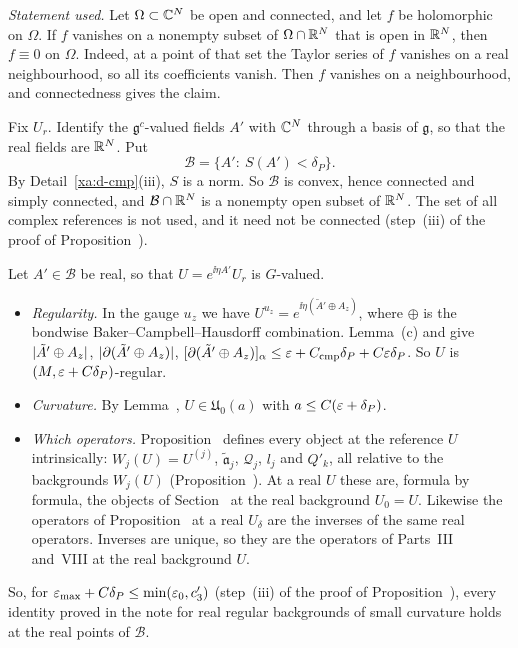 \begin{detail}\label{xa:d-identity}
\emph{Statement used.} Let $\Omega\subset\mathbb C^N$ be open and connected, and let $f$ be holomorphic on $\Omega$. If $f$ vanishes on a nonempty subset of $\Omega\cap\mathbb R^N$ that is open in $\mathbb R^N$, then $f\equiv0$ on $\Omega$. Indeed, at a point of that set the Taylor series of $f$ vanishes on a real neighbourhood, so all its coefficients vanish. Then $f$ vanishes on a neighbourhood, and connectedness gives the claim.

\begin{step}
Fix $U_r$. Identify the $\mathfrak g^c$-valued fields $A'$ with $\mathbb C^N$ through a basis of $\mathfrak g$, so that the real fields are $\mathbb R^N$. Put
\[
\mathcal B=\{A':\ S(A')<\delta_P\}.
\]
By Detail~\ref{xa:d-cmp}(iii), $S$ is a norm. So $\mathcal B$ is convex, hence connected and simply connected, and $\mathcal B\cap\mathbb R^N$ is a nonempty open subset of $\mathbb R^N$. The set of all complex references is not used, and it need not be connected (step~(iii) of the proof of Proposition~).
\end{step}

\begin{step}
Let $A'\in\mathcal B$ be real, so that $U=e^{\ii\eta A'}U_r$ is $G$-valued.
\begin{itemize}
\item \emph{Regularity.} In the gauge $u_z$ we have $U^{u_z}=e^{\ii\eta(\tilde A'\oplus A_z)}$, where $\oplus$ is the bondwise Baker--Campbell--Hausdorff combination. Lemma~(c) and  give $\lvert\tilde A'\oplus A_z\rvert$, $\lvert\partial(\tilde A'\oplus A_z)\rvert$, $[\partial(\tilde A'\oplus A_z)]_\alpha\le\varepsilon+C_{\rm cmp}\delta_P+C\varepsilon\delta_P$. So $U$ is $(M,\varepsilon+C\delta_P)$-regular.
\item \emph{Curvature.} By Lemma~, $U\in\mathfrak U_0(a)$ with $a\le C(\varepsilon+\delta_P)$.
\item \emph{Which operators.} Proposition~ defines every object at the reference $U$ intrinsically: $W_j(U)=U^{(j)}$, $\tilde{\mathfrak a}_j$, $\mathcal Q_j$, $l_j$ and $Q'_k$, all relative to the backgrounds $W_j(U)$ (Proposition~). At a real $U$ these are, formula by formula, the objects of Section~ at the real background $U_0=U$. Likewise the operators of Proposition~ at a real $U_\delta$ are the inverses of the same real operators. Inverses are unique, so they are the operators of Parts~III and~VIII at the real background $U$.
\end{itemize}
So, for $\varepsilon_{\max}+C\delta_P\le\min(\varepsilon_0,c'_3)$ (step~(iii) of the proof of Proposition~), every identity proved in the note for real regular backgrounds of small curvature holds at the real points of $\mathcal B$.
\end{step}


\end{detail}
